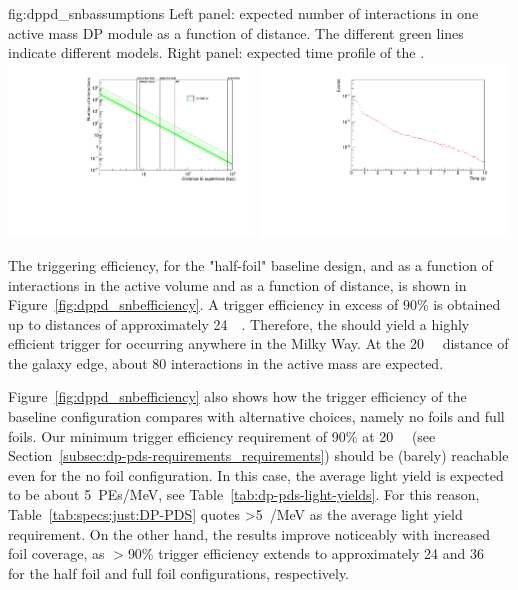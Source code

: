\begin{dunefigure}{fig:dppd_snbassumptions}
     {Left panel: expected number of  \nue {} interactions in one \dpactivelarmass active mass DP module as a function of  distance. The different green lines indicate different  models. Right panel: expected time profile of the .}
    \includegraphics[width=0.49\textwidth]{graphics/dppd_events_vs_sndistance.pdf} \hfill
    \includegraphics[width=0.49\textwidth]{graphics/dppd_sntime_profile.pdf} 
    \end{dunefigure}

The  triggering efficiency, for the "half-foil" baseline  design, and as a function of  interactions in the active volume and as a function of  distance, is shown in Figure~\ref{fig:dppd_snbefficiency}. A trigger efficiency in excess of \num{90}\% is obtained up to  distances of approximately \SI{24}{\kilo\parsec}. Therefore, the  should yield a highly efficient trigger for  occurring anywhere in the Milky Way. At the \SI{20}{\kilo\parsec} distance of the galaxy  edge, about \num{80}  interactions in the \dpactivelarmass active mass are expected. 

Figure~\ref{fig:dppd_snbefficiency} also shows how the  trigger efficiency of the baseline configuration compares with alternative choices, namely no foils and full foils. Our minimum  trigger efficiency requirement of \num{90}\% at \SI{20}{\kilo\parsec} (see Section~\ref{subsec:dp-pds-requirements_requirements}) should be (barely) reachable even for the no foil configuration. In this case, the average light yield is expected to be about \SI{5}{PEs/MeV}, see Table~\ref{tab:dp-pds-light-yields}. For this reason, Table~\ref{tab:specs:just:DP-PDS} quotes \SI{>5}{/\MeV} as the average light yield requirement. On the other hand, the results improve noticeably with increased foil coverage, as $>$\num{90}\% trigger efficiency extends to approximately \num{24} and \SI{36}{\kilo\parsec} for the half foil and full foil configurations, respectively. 

